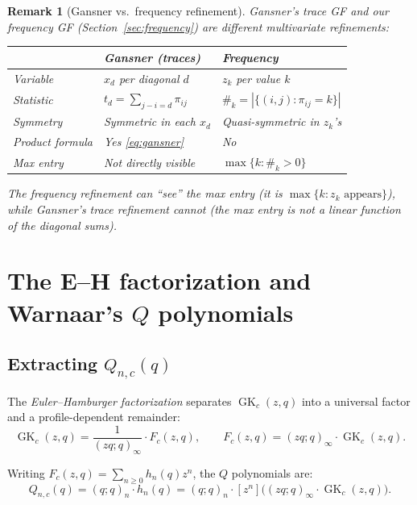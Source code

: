 \documentclass[11pt]{article}
\newtheorem{remark}[theorem]{Remark}
\newcommand{\GK}{\operatorname{GK}}
\newcommand{\qpoch}[2]{(#1;#2)_\infty}
\newcommand{\qpochn}[3]{(#1;#2)_{#3}}
\begin{document}
\begin{remark}[Gansner vs.\ frequency refinement]
Gansner's trace GF and our frequency GF
(Section~\ref{sec:frequency}) are \emph{different}
multivariate refinements:
\begin{center}
\begin{tabular}{l|l|l}
  & \textbf{Gansner (traces)} &
  \textbf{Frequency} \\
  \hline
  Variable & $x_d$ per diagonal $d$ &
  $z_k$ per value $k$ \\
  Statistic & $t_d = \sum_{j-i=d} \pi_{ij}$ &
  $\#_k = |\{(i,j) : \pi_{ij} = k\}|$ \\
  Symmetry & Symmetric in each $x_d$
  & Quasi-symmetric in $z_k$'s \\
  Product formula & Yes \eqref{eq:gansner} & No \\
  Max entry & Not directly visible &
  $\max\{k : \#_k > 0\}$
\end{tabular}
\end{center}
The frequency refinement can ``see'' the max entry
(it is $\max\{k : z_k \text{ appears}\}$), while Gansner's
trace refinement cannot (the max entry is not a linear
function of the diagonal sums).
\end{remark}

\section{The E--H factorization and Warnaar's $Q$ polynomials}
\label{sec:EH}

\subsection{Extracting $Q_{n,c}(q)$}

The \emph{Euler--Hamburger factorization} separates
$\GK_c(z,q)$ into a universal factor and a profile-dependent
remainder:
\begin{equation}\label{eq:EH}
  \GK_c(z,q) = \frac{1}{\qpoch{zq}{q}} \cdot F_c(z,q),
  \qquad
  F_c(z,q) = \qpoch{zq}{q} \cdot \GK_c(z,q).
\end{equation}

Writing $F_c(z,q) = \sum_{n \geq 0} h_n(q) z^n$, the
$Q$ polynomials are:
\begin{equation}\label{eq:Q-def}
  Q_{n,c}(q) = \qpochn{q}{q}{n} \cdot h_n(q)
  = \qpochn{q}{q}{n}
  \cdot [z^n]\bigl(\qpoch{zq}{q} \cdot \GK_c(z,q)\bigr).
\end{equation}
\end{document}
